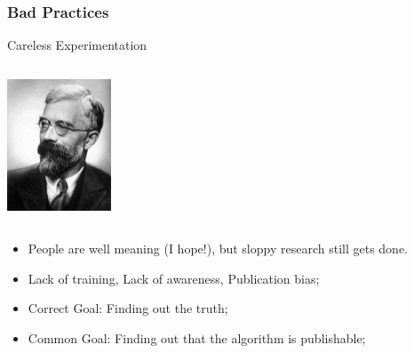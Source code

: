 \documentclass{beamer}
\begin{document}
\begin{frame}
  \frametitle{Bad Practices}

  \begin{block}{Careless Experimentation}

    \begin{columns}[c]
      \includegraphics[width=0.5\textwidth]{img/fisher}
    \end{columns}

    \medskip

    \begin{itemize}
      \item People are well meaning (I hope!), but sloppy research
        still gets done.
        \smallskip

      \item<2-> Lack of training, Lack of awareness, Publication bias;
        \smallskip

      \item<3-> Correct Goal: Finding out the truth;
      \item<3-> Common Goal: Finding out that the algorithm is
        publishable;
        \smallskip
    \end{itemize}
  \end{block}
\end{frame}
\end{document}
